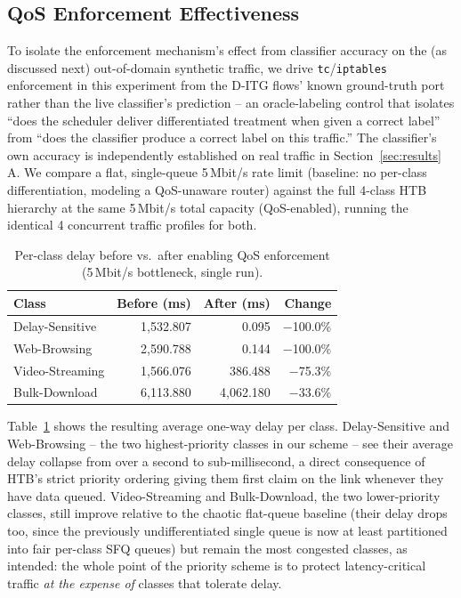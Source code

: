 \documentclass[10pt,twocolumn]{article}
\begin{document}
\subsection{QoS Enforcement Effectiveness}
\label{sec:qos-pilot}

To isolate the enforcement mechanism's effect from classifier accuracy on
the (as discussed next) out-of-domain synthetic traffic, we drive
\texttt{tc}/\texttt{iptables} enforcement in this experiment from the
D-ITG flows' known ground-truth port rather than the live classifier's
prediction -- an oracle-labeling control that isolates ``does the
scheduler deliver differentiated treatment when given a correct label''
from ``does the classifier produce a correct label on this traffic.''
The classifier's own accuracy is independently established on real
traffic in Section~\ref{sec:results}\,A. We compare a flat, single-queue
5\,Mbit/s rate limit (baseline: no per-class differentiation, modeling a
QoS-unaware router) against the full 4-class HTB hierarchy at the same
5\,Mbit/s total capacity (QoS-enabled), running the identical 4
concurrent traffic profiles for both.

\begin{table}[t]
\centering
\caption{Per-class delay before vs.\ after enabling QoS enforcement (5\,Mbit/s bottleneck, single run).}
\label{tab:qos}
\small
\begin{tabular}{lrrr}
\toprule
Class & Before (ms) & After (ms) & Change \\
\midrule
Delay-Sensitive & 1{,}532.807 & 0.095 & $-$100.0\% \\
Web-Browsing & 2{,}590.788 & 0.144 & $-$100.0\% \\
Video-Streaming & 1{,}566.076 & 386.488 & $-$75.3\% \\
Bulk-Download & 6{,}113.880 & 4{,}062.180 & $-$33.6\% \\
\bottomrule
\end{tabular}
\end{table}

Table~\ref{tab:qos} shows the resulting average one-way delay per class.
Delay-Sensitive and Web-Browsing -- the two highest-priority classes in
our scheme -- see their average delay collapse from over a second to
sub-millisecond, a direct consequence of HTB's strict priority ordering
giving them first claim on the link whenever they have data queued.
Video-Streaming and Bulk-Download, the two lower-priority classes, still
improve relative to the chaotic flat-queue baseline (their delay drops
too, since the previously undifferentiated single queue is now at least
partitioned into fair per-class SFQ queues) but remain the most congested
classes, as intended: the whole point of the priority scheme is to
protect latency-critical traffic \emph{at the expense of} classes that
tolerate delay.
\end{document}
